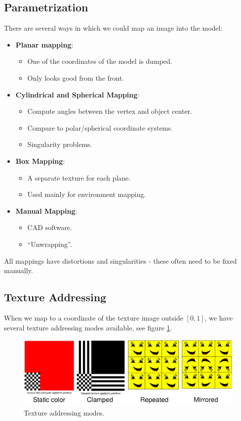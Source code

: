 \documentclass[11pt]{article}
\begin{document}
\subsection{Parametrization}
There are several ways in which we could map an image into the model:
\begin{itemize}
  \item \textbf{Planar mapping}:
    \begin{itemize}
      \item One of the coordinates of the model is dumped.
      \item Only looks good from the front.
    \end{itemize}
  \item \textbf{Cylindrical and Spherical Mapping}:
    \begin{itemize}
      \item Compute angles between the vertex and object center.
      \item Compare to polar/spherical coordinate systems.
      \item Singularity problems.
    \end{itemize}
  \item \textbf{Box Mapping}:
    \begin{itemize}
      \item A separate texture for each plane.
      \item Used mainly for environment mapping.
    \end{itemize}
  \item \textbf{Manual Mapping}:
    \begin{itemize}
      \item CAD software.
      \item ``Unwrapping''.
    \end{itemize}
\end{itemize}

All mappings have distortions and singularities - these often need to be fixed manually.

\subsection{Texture Addressing}
When we map to a coordinate of the texture image outside $[0, 1]$, we have several texture addressing modes available, see figure \ref{fig:addressing}.

\begin{figure}[htb!]
  \centering
  \caption{Texture addressing modes.}
  \label{fig:addressing}
  \includegraphics[scale=0.3]{addressing}
\end{figure}
\end{document}
